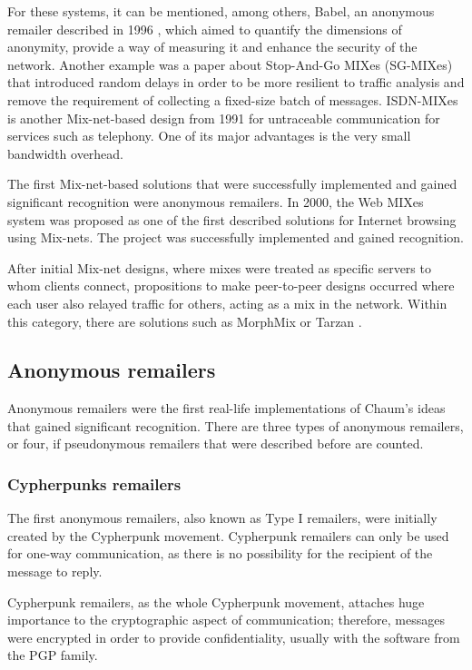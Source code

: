 For these systems, it can be mentioned, among others, Babel, an anonymous remailer described in 1996 \cite{babel}, which aimed to quantify the dimensions of anonymity, provide a way of measuring it and enhance the security of the network. Another example was a paper about Stop-And-Go MIXes (SG-MIXes) \cite{stop-and-go} that introduced random delays in order to be more resilient to traffic analysis and remove the requirement of collecting a fixed-size batch of messages.
ISDN-MIXes \cite{Pfitzmann91} is another Mix-net-based design from 1991 for untraceable communication for services such as telephony. One of its major advantages is the very small bandwidth overhead.

The first Mix-net-based solutions that were successfully implemented and gained significant recognition were anonymous remailers.
In 2000, the Web MIXes system \cite{web-mixes} was proposed as one of the first described solutions for Internet browsing using Mix-nets. The project was successfully implemented and gained recognition.

After initial Mix-net designs, where mixes were treated as specific servers to whom clients connect, propositions to make peer-to-peer designs occurred where each user also relayed traffic for others, acting as a mix in the network. Within this category, there are solutions such as MorphMix \cite{morphmix} or Tarzan \cite{tarzan}.

\subsection{Anonymous remailers}
Anonymous remailers were the first real-life implementations of Chaum's ideas that gained significant recognition. There are three types of anonymous remailers, or four, if pseudonymous remailers that were described before are counted.

\subsubsection{Cypherpunks remailers}
The first anonymous remailers, also known as Type I remailers, were initially created by the Cypherpunk movement. Cypherpunk remailers can only be used for one-way communication, as there is no possibility for the recipient of the message to reply. 

Cypherpunk remailers, as the whole Cypherpunk movement, attaches huge importance to the cryptographic aspect of communication; therefore, messages were encrypted in order to provide confidentiality, usually with the software from the PGP family.

